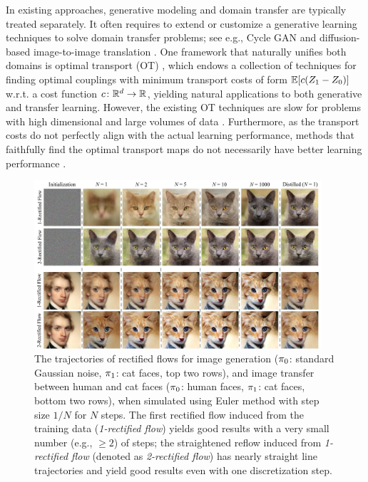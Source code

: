 In existing approaches, generative modeling and domain transfer 
are  typically treated  separately. 
It often requires to extend or customize a generative learning techniques to solve domain transfer problems; see e.g., Cycle GAN \citep{cyclegan} and diffusion-based image-to-image translation \citep[e.g.,][]{su2022dual, zhao2022egsde}. 
One framework that naturally unifies both domains is 
 optimal transport (OT)  \citep[e.g.,][]{villani2021topics,ambrosio2021lectures,figalli2021invitation,peyre2019computational}, which 
endows a collection of techniques for finding optimal
couplings with minimum transport costs of form 
$\mathbb{E}[c(Z_1-Z_0)]$ w.r.t. a cost function $c\colon \mathbb{R}^d\to \mathbb{R}$, yielding 
natural applications  to both generative and transfer learning. 
However, 
the existing OT techniques 
are slow for problems with high dimensional and large volumes of data \citep{peyre2019computational}. 
Furthermore, 
as the transport costs do not perfectly align with 
the actual learning performance, 
methods that faithfully find the optimal transport maps 
do not necessarily have better learning performance \citep{korotin2021neural}. 





\begin{figure}[h]
    \centering
    \includegraphics[width=0.95\textwidth]{arxiv_figures/cat_triangle_new_2_cy.pptx.jpeg} %
    \caption{The trajectories of rectified flows for 
    image generation 
    (${\pi}_0$: standard Gaussian noise,  ${\pi}_1$: cat faces, top two rows), 
    and image transfer between human and cat faces (${\pi}_0$: human faces,  ${\pi}_1$: cat faces, bottom two rows), 
    when simulated using Euler method with step size $1/N$ for $N$ steps. 
    The first rectified flow induced from the training data (\emph{1-rectified flow}) yields good results with a very small number (e.g., $\geq 2$) of steps; 
   the straightened reflow induced from \emph{1-rectified flow} (denoted as \emph{2-rectified flow})   
   has nearly straight line trajectories and yield good results even with one  discretization step. 
    }
    \label{fig:cat_k}
\end{figure}


